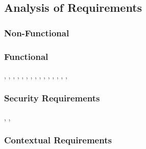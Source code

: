\subsection{Analysis of Requirements}

\subsubsection{Non-Functional}

\cite{Slankas:2013}

\subsubsection{Functional}

\cite{Deocadez:2017}, \cite{Kurtanovic:2017}, \cite{Guzman:2017},
\cite{Abad:2017}, \cite{Dekhtyar:2017}, \cite{Rashwan:2012}, \cite{Lu:2017},
\cite{Hayes:2014}, \cite{Williams:2017}, \cite{Garzoli:2013},
\cite{Casamayor:2010}, \cite{Wang:2016}, \cite{Hussain:2012}, \cite{Jiang:2014},
\cite{Jha:2017}, \cite{Pinquie:2015}

\subsubsection{Security Requirements} 

\cite{Jildal:2016}, \cite{Riaz:2014}, \cite{Knauss:2014} 

\subsubsection{Contextual Requirements} 

